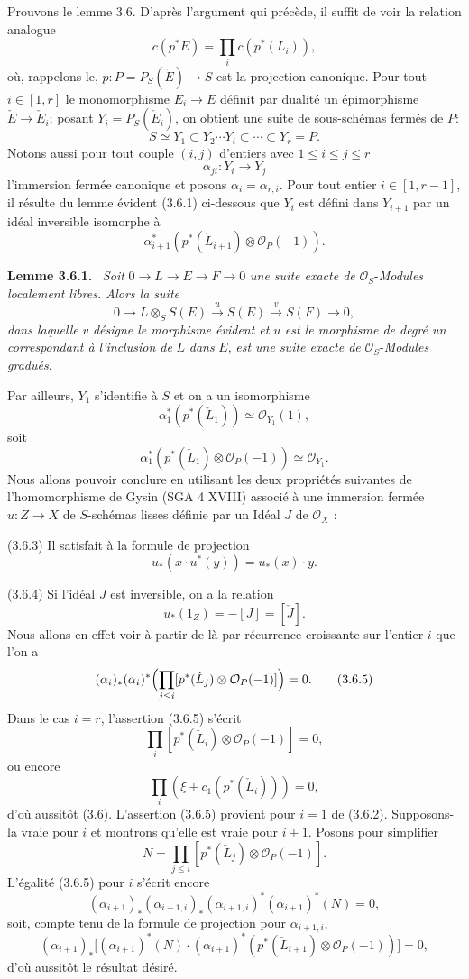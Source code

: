 \documentclass[11pt]{article}
\newenvironment{statement}[1]{\par\medskip\noindent\textbf{#1.}\ }{\par\medskip}
\begin{document}
Prouvons le lemme 3.6. D'après l'argument qui précède, il suffit de voir la relation analogue
\[
c(p^*E)=\prod_i c(p^*(L_i)),
\]
où, rappelons-le, $p:P=P_S(\check E)\to S$ est la projection canonique. Pour tout $i\in[1,r]$ le monomorphisme $E_i\to E$ définit par dualité un épimorphisme $\check E\to\check E_i$; posant $Y_i=P_S(\check E_i)$, on obtient une suite de sous-schémas fermés de $P$:
\[
S\simeq Y_1\subset Y_2\cdots Y_i\subset\cdots\subset Y_r=P.
\]
Notons aussi pour tout couple $(i,j)$ d'entiers avec $1\le i\le j\le r$
\[
\alpha_{ji}:Y_i\to Y_j
\]
l'immersion fermée canonique et posons $\alpha_i=\alpha_{r,i}$. Pour tout entier $i\in[1,r-1]$, il résulte du lemme évident (3.6.1) ci-dessous que $Y_i$ est défini dans $Y_{i+1}$ par un idéal inversible isomorphe à
\[
\alpha_{i+1}^*(p^*(\check L_{i+1})\otimes\mathcal O_P(-1)).
\]

\begin{statement}{Lemme 3.6.1}
\emph{Soit} $0\to L\to E\to F\to0$ \emph{une suite exacte de} $\mathcal O_S$-\emph{Modules localement libres. Alors la suite}
\[
0\to L\otimes_S S(E)\xrightarrow{u}S(E)\xrightarrow{v}S(F)\to0,
\]
\emph{dans laquelle} $v$ \emph{désigne le morphisme évident et} $u$ \emph{est le morphisme de degré un correspondant à l'inclusion de} $L$ \emph{dans} $E$, \emph{est une suite exacte de} $\mathcal O_S$-\emph{Modules gradués}.
\end{statement}

Par
ailleurs, $Y_1$ s'identifie à $S$ et on a un isomorphisme
\[
\alpha_1^*(p^*(\check L_1))\simeq\mathcal O_{Y_1}(1),
\]
soit
\[
\alpha_1^*(p^*(\check L_1)\otimes\mathcal O_P(-1))\simeq \mathcal O_{Y_1}.
\tag{3.6.2.}
\]
Nous allons pouvoir conclure en utilisant les deux propriétés suivantes de l'homomorphisme de Gysin (SGA 4 XVIII) associé à une immersion fermée $u:Z\to X$ de $S$-schémas lisses définie par un Idéal $J$ de $\mathcal O_X$ :

(3.6.3) Il satisfait à la formule de projection
\[
u_*(x\cdot u^*(y))=u_*(x)\cdot y.
\]

(3.6.4) Si l'idéal $J$ est inversible, on a la relation
\[
u_*(1_Z)=-[J]=[\check J].
\]
Nous allons en effet voir à partir de là par récurrence croissante sur l'entier $i$ que l'on a
\[
(\alpha_i)_*(\alpha_i)^*\Bigl(\prod_{j\le i}[p^*(\check L_j)\otimes\mathcal O_P(-1)]\Bigr)=0.
\tag{3.6.5}
\]
Dans le cas $i=r$, l'assertion (3.6.5) s'écrit
\[
\prod_i[p^*(\check L_i)\otimes\mathcal O_P(-1)]=0,
\]
ou encore
\[
\prod_i(\xi+c_1(p^*(\check L_i)))=0,
\]
d'où aussitôt (3.6). L'assertion (3.6.5) provient pour $i=1$ de (3.6.2). Supposons-la vraie pour $i$ et montrons qu'elle est vraie pour $i+1$. Posons pour simplifier
\[
N=\prod_{j\le i}[p^*(\check L_j)\otimes\mathcal O_P(-1)].
\]
L'égalité (3.6.5) pour $i$ s'écrit encore
\[
(\alpha_{i+1})_*(\alpha_{i+1,i})_*(\alpha_{i+1,i})^*(\alpha_{i+1})^*(N)=0,
\]
soit, compte tenu de la formule de projection pour $\alpha_{i+1,i}$,
\[
(\alpha_{i+1})_*\bigl[(\alpha_{i+1})^*(N)\cdot(\alpha_{i+1})^*(p^*(\check L_{i+1})\otimes\mathcal O_P(-1))\bigr]=0,
\]
d'où aussitôt le
résultat désiré.
\end{document}
